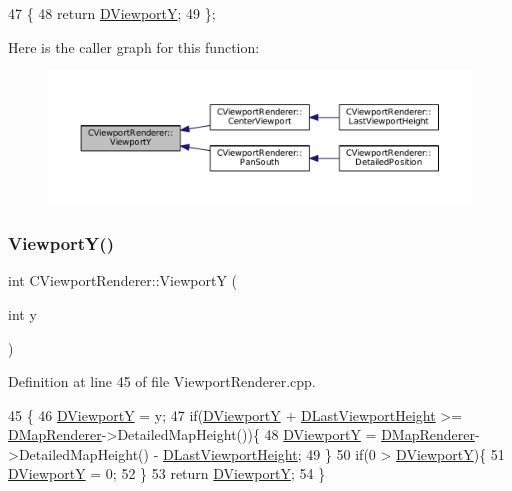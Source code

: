 \begin{DoxyCode}
47                              \{
48             \textcolor{keywordflow}{return} \hyperlink{classCViewportRenderer_ae13dd437a3da3d2bab16bc7ba61cb78f}{DViewportY};  
49         \};
\end{DoxyCode}
Here is the caller graph for this function\+:
\nopagebreak
\begin{figure}[H]
\begin{center}
\leavevmode
\includegraphics[width=350pt]{classCViewportRenderer_add3d4da286927abe2f19fbb37fd42ed5_icgraph}
\end{center}
\end{figure}
\hypertarget{classCViewportRenderer_aebbe5e095b192de093376cde3cfc82dc}{}\label{classCViewportRenderer_aebbe5e095b192de093376cde3cfc82dc} 
\subsubsection{\texorpdfstring{Viewport\+Y()}{ViewportY()}\hspace{0.1cm}{\footnotesize\ttfamily [2/2]}}
{\footnotesize\ttfamily int C\+Viewport\+Renderer\+::\+ViewportY (\begin{DoxyParamCaption}\item[{int}]{y }\end{DoxyParamCaption})}



Definition at line 45 of file Viewport\+Renderer.\+cpp.


\begin{DoxyCode}
45                                      \{
46     \hyperlink{classCViewportRenderer_ae13dd437a3da3d2bab16bc7ba61cb78f}{DViewportY} = y;
47     \textcolor{keywordflow}{if}(\hyperlink{classCViewportRenderer_ae13dd437a3da3d2bab16bc7ba61cb78f}{DViewportY} + \hyperlink{classCViewportRenderer_aaca5c330615fc2aacc57dede8e7c18b0}{DLastViewportHeight} >= 
      \hyperlink{classCViewportRenderer_ac6bc7771bd6dcd35107d25bebb0c0a4c}{DMapRenderer}->DetailedMapHeight())\{
48         \hyperlink{classCViewportRenderer_ae13dd437a3da3d2bab16bc7ba61cb78f}{DViewportY} = \hyperlink{classCViewportRenderer_ac6bc7771bd6dcd35107d25bebb0c0a4c}{DMapRenderer}->DetailedMapHeight() - 
      \hyperlink{classCViewportRenderer_aaca5c330615fc2aacc57dede8e7c18b0}{DLastViewportHeight};
49     \}
50     \textcolor{keywordflow}{if}(0 > \hyperlink{classCViewportRenderer_ae13dd437a3da3d2bab16bc7ba61cb78f}{DViewportY})\{
51         \hyperlink{classCViewportRenderer_ae13dd437a3da3d2bab16bc7ba61cb78f}{DViewportY} = 0;
52     \}
53     \textcolor{keywordflow}{return} \hyperlink{classCViewportRenderer_ae13dd437a3da3d2bab16bc7ba61cb78f}{DViewportY};
54 \}
\end{DoxyCode}



